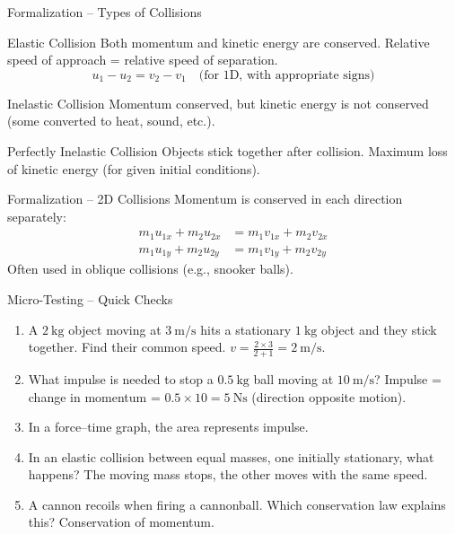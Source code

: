\documentclass[11pt]{beamer}
\begin{document}
\begin{frame}{Formalization – Types of Collisions}
\begin{block}{Elastic Collision}
Both momentum and kinetic energy are conserved.
Relative speed of approach = relative speed of separation.
\[ u_1 - u_2 = v_2 - v_1 \quad\text{(for 1D, with appropriate signs)} \]
\end{block}
\begin{block}{Inelastic Collision}
Momentum conserved, but kinetic energy is not conserved (some converted to heat, sound, etc.).
\end{block}
\begin{block}{Perfectly Inelastic Collision}
Objects stick together after collision. Maximum loss of kinetic energy (for given initial conditions).
\end{block}
\end{frame}

\begin{frame}{Formalization – 2D Collisions}
Momentum is conserved in each direction separately:
\begin{align*}
    m_1 u_{1x} + m_2 u_{2x} &= m_1 v_{1x} + m_2 v_{2x} \\
    m_1 u_{1y} + m_2 u_{2y} &= m_1 v_{1y} + m_2 v_{2y}
\end{align*}
Often used in oblique collisions (e.g., snooker balls).
\end{frame}

\begin{frame}{Micro-Testing – Quick Checks}
\begin{enumerate}
    \item A $2\ \mathrm{kg}$ object moving at $3\ \mathrm{m/s}$ hits a stationary $1\ \mathrm{kg}$ object and they stick together. Find their common speed. \pause \alert{$\displaystyle v = \frac{2\times3}{2+1} = 2\ \mathrm{m/s}$}.
    \item What impulse is needed to stop a $0.5\ \mathrm{kg}$ ball moving at $10\ \mathrm{m/s}$? \pause \alert{Impulse = change in momentum = $0.5\times10 = 5\ \mathrm{Ns}$ (direction opposite motion)}.
    \item In a force–time graph, the area represents \pause \alert{impulse}.
    \item In an elastic collision between equal masses, one initially stationary, what happens? \pause \alert{The moving mass stops, the other moves with the same speed.}
    \item A cannon recoils when firing a cannonball. Which conservation law explains this? \pause \alert{Conservation of momentum.}
\end{enumerate}
\end{frame}
\end{document}
